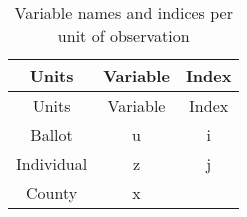\documentclass[12pt,twoside]{reedthesis}
\begin{document}
  \begin{longtable}[]{@{}ccc@{}}
  \caption{Variable names and indices per unit of observation
  \label{tab:units_vars}}\tabularnewline
  \toprule
  \begin{minipage}[b]{0.27\columnwidth}\centering\strut
  Units\strut
  \end{minipage} & \begin{minipage}[b]{0.20\columnwidth}\centering\strut
  Variable\strut
  \end{minipage} & \begin{minipage}[b]{0.15\columnwidth}\centering\strut
  Index\strut
  \end{minipage}\tabularnewline
  \midrule
  \endfirsthead
  \toprule
  \begin{minipage}[b]{0.27\columnwidth}\centering\strut
  Units\strut
  \end{minipage} & \begin{minipage}[b]{0.20\columnwidth}\centering\strut
  Variable\strut
  \end{minipage} & \begin{minipage}[b]{0.15\columnwidth}\centering\strut
  Index\strut
  \end{minipage}\tabularnewline
  \midrule
  \endhead
  \begin{minipage}[t]{0.27\columnwidth}\centering\strut
  Ballot\strut
  \end{minipage} & \begin{minipage}[t]{0.20\columnwidth}\centering\strut
  u\strut
  \end{minipage} & \begin{minipage}[t]{0.15\columnwidth}\centering\strut
  i\strut
  \end{minipage}\tabularnewline
  \begin{minipage}[t]{0.27\columnwidth}\centering\strut
  Individual\strut
  \end{minipage} & \begin{minipage}[t]{0.20\columnwidth}\centering\strut
  z\strut
  \end{minipage} & \begin{minipage}[t]{0.15\columnwidth}\centering\strut
  j\strut
  \end{minipage}\tabularnewline
  \begin{minipage}[t]{0.27\columnwidth}\centering\strut
  County\strut
  \end{minipage} & \begin{minipage}[t]{0.20\columnwidth}\centering\strut
  x\strut
  \end{minipage} & \begin{minipage}[t]{0.15\columnwidth}\centering\strut

\end{minipage}
\end{longtable}
\end{document}
